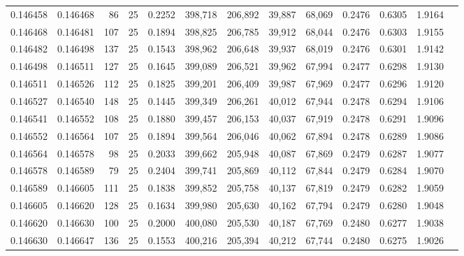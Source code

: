 \begin{tabular}{rrrrrrrrrrrrr}
0.146458 & 0.146468 &    86 &  25 &                                     0.2252 & 398,718 & 206,892 &  39,887 &  68,069 & 0.2476 & 0.6305 & 1.9164 \\
0.146468 & 0.146481 &   107 &  25 &                                     0.1894 & 398,825 & 206,785 &  39,912 &  68,044 & 0.2476 & 0.6303 & 1.9155 \\
0.146482 & 0.146498 &   137 &  25 &                                     0.1543 & 398,962 & 206,648 &  39,937 &  68,019 & 0.2476 & 0.6301 & 1.9142 \\
0.146498 & 0.146511 &   127 &  25 &                                     0.1645 & 399,089 & 206,521 &  39,962 &  67,994 & 0.2477 & 0.6298 & 1.9130 \\
0.146511 & 0.146526 &   112 &  25 &                                     0.1825 & 399,201 & 206,409 &  39,987 &  67,969 & 0.2477 & 0.6296 & 1.9120 \\
0.146527 & 0.146540 &   148 &  25 &                                     0.1445 & 399,349 & 206,261 &  40,012 &  67,944 & 0.2478 & 0.6294 & 1.9106 \\
0.146541 & 0.146552 &   108 &  25 &                                     0.1880 & 399,457 & 206,153 &  40,037 &  67,919 & 0.2478 & 0.6291 & 1.9096 \\
0.146552 & 0.146564 &   107 &  25 &                                     0.1894 & 399,564 & 206,046 &  40,062 &  67,894 & 0.2478 & 0.6289 & 1.9086 \\
0.146564 & 0.146578 &    98 &  25 &                                     0.2033 & 399,662 & 205,948 &  40,087 &  67,869 & 0.2479 & 0.6287 & 1.9077 \\
0.146578 & 0.146589 &    79 &  25 &                                     0.2404 & 399,741 & 205,869 &  40,112 &  67,844 & 0.2479 & 0.6284 & 1.9070 \\
0.146589 & 0.146605 &   111 &  25 &                                     0.1838 & 399,852 & 205,758 &  40,137 &  67,819 & 0.2479 & 0.6282 & 1.9059 \\
0.146605 & 0.146620 &   128 &  25 &                                     0.1634 & 399,980 & 205,630 &  40,162 &  67,794 & 0.2479 & 0.6280 & 1.9048 \\
0.146620 & 0.146630 &   100 &  25 &                                     0.2000 & 400,080 & 205,530 &  40,187 &  67,769 & 0.2480 & 0.6277 & 1.9038 \\
0.146630 & 0.146647 &   136 &  25 &                                     0.1553 & 400,216 & 205,394 &  40,212 &  67,744 & 0.2480 & 0.6275 & 1.9026 \\

\end{tabular}
